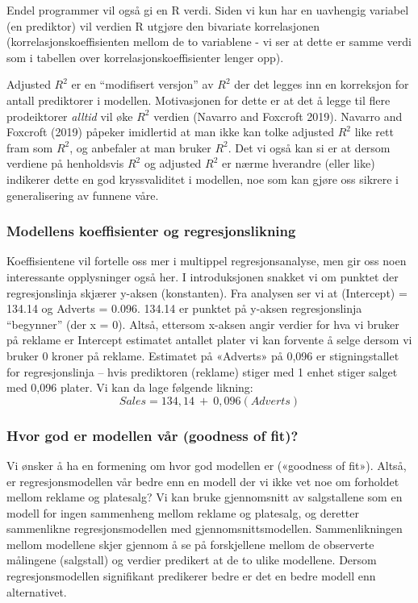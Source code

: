 \documentclass[
]{article}
\begin{document}
Endel programmer vil også gi en R verdi. Siden vi kun har en uavhengig
variabel (en prediktor) vil verdien R utgjøre den bivariate
korrelasjonen (korrelasjonskoeffisienten mellom de to variablene - vi
ser at dette er samme verdi som i tabellen over
korrelasjonskoeffisienter lenger opp).

Adjusted \(R^{2}\) er en ``modifisert versjon'' av \(R^{2}\) der det
legges inn en korreksjon for antall prediktorer i modellen. Motivasjonen
for dette er at det å legge til flere prodeiktorer \emph{alltid} vil øke
\(R^{2}\) verdien (Navarro and Foxcroft 2019). Navarro and Foxcroft
(2019) påpeker imidlertid at man ikke kan tolke adjusted \(R^{2}\) like
rett fram som \(R^{2}\), og anbefaler at man bruker \(R^{2}\). Det vi
også kan si er at dersom verdiene på henholdsvis \(R^{2}\) og adjusted
\(R^{2}\) er nærme hverandre (eller like) indikerer dette en god
kryssvaliditet i modellen, noe som kan gjøre oss sikrere i
generalisering av funnene våre.

\hypertarget{modellens-koeffisienter-og-regresjonslikning}{%
\subsubsection{Modellens koeffisienter og
regresjonslikning}\label{modellens-koeffisienter-og-regresjonslikning}}

Koeffisientene vil fortelle oss mer i multippel regresjonsanalyse, men
gir oss noen interessante opplysninger også her. I introduksjonen
snakket vi om punktet der regresjonslinja skjærer y-aksen (konstanten).
Fra analysen ser vi at (Intercept) = 134.14 og Adverts = 0.096. 134.14
er punktet på y-aksen regresjonslinja ``begynner'' (der x = 0). Altså,
ettersom x-aksen angir verdier for hva vi bruker på reklame er Intercept
estimatet antallet plater vi kan forvente å selge dersom vi bruker 0
kroner på reklame. Estimatet på «Adverts» på 0,096 er stigningstallet
for regresjonslinja -- hvis prediktoren (reklame) stiger med 1 enhet
stiger salget med 0,096 plater. Vi kan da lage følgende likning:
\[ Sales=134,14\:+\:0,096\left(Adverts\right) \]

\hypertarget{hvor-god-er-modellen-vuxe5r-goodness-of-fit}{%
\subsubsection{Hvor god er modellen vår (goodness of
fit)?}\label{hvor-god-er-modellen-vuxe5r-goodness-of-fit}}

Vi ønsker å ha en formening om hvor god modellen er («goodness of fit»).
Altså, er regresjonsmodellen vår bedre enn en modell der vi ikke vet noe
om forholdet mellom reklame og platesalg? Vi kan bruke gjennomsnitt av
salgstallene som en modell for ingen sammenheng mellom reklame og
platesalg, og deretter sammenlikne regresjonsmodellen med
gjennomsnittsmodellen. Sammenlikningen mellom modellene skjer gjennom å
se på forskjellene mellom de observerte målingene (salgstall) og verdier
predikert at de to ulike modellene. Dersom regresjonsmodellen
signifikant predikerer bedre er det en bedre modell enn alternativet.
\end{document}
